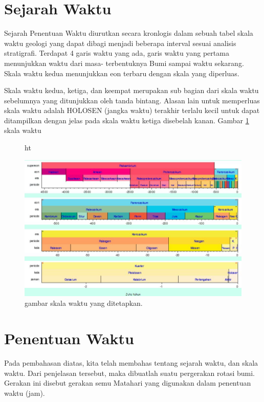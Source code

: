 

\section{Sejarah Waktu}
Sejarah Penentuan Waktu diurutkan secara kronlogis dalam sebuah tabel skala waktu geologi 
yang dapat dibagi menjadi beberapa interval sesuai analisis stratigrafi. 
Terdapat 4 garis waktu yang ada, garis waktu yang pertama menunjukkan waktu dari masa-
terbentuknya Bumi sampai waktu sekarang\cite{suryasejarah}. 
Skala waktu kedua menunjukkan eon terbaru dengan skala yang diperluas.

Skala waktu kedua, ketiga, dan keempat merupakan sub bagian 
dari skala waktu sebelumnya yang ditunjukkan oleh tanda bintang. 
Alasan lain untuk memperluas skala waktu adalah HOLOSEN (jangka waktu) terakhir 
terlalu kecil untuk dapat ditampilkan dengan jelas
pada skala waktu ketiga disebelah kanan. Gambar \ref{sejarahpenentuan} skala waktu

\begin{figure}{ht}
\centerline{\includegraphics[width=1\textwidth]{figures/sejarahpenentuan.JPG}}
\caption{gambar skala waktu yang ditetapkan.}
\label{sejarahpenentuan}
\end{figure}

\section{Penentuan Waktu}
Pada pembahasan diatas, kita telah membahas tentang sejarah waktu, dan skala waktu. 
Dari penjelasan tersebut, maka dibuatlah suatu pergerakan rotasi bumi. 
Gerakan ini disebut gerakan semu Matahari yang digunakan dalam penentuan waktu (jam).

